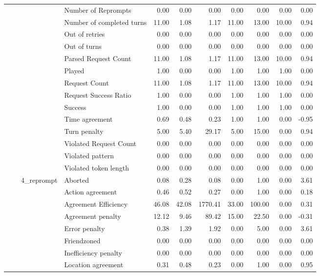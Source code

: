 \begin{tabular}{llllrrrrrrr}
 &  &  & Number of Reprompts & 0.00 & 0.00 & 0.00 & 0.00 & 0.00 & 0.00 & 0.00 \\
 &  &  & Number of completed turns & 11.00 & 1.08 & 1.17 & 11.00 & 13.00 & 10.00 & 0.94 \\
 &  &  & Out of retries & 0.00 & 0.00 & 0.00 & 0.00 & 0.00 & 0.00 & 0.00 \\
 &  &  & Out of turns & 0.00 & 0.00 & 0.00 & 0.00 & 0.00 & 0.00 & 0.00 \\
 &  &  & Parsed Request Count & 11.00 & 1.08 & 1.17 & 11.00 & 13.00 & 10.00 & 0.94 \\
 &  &  & Played & 1.00 & 0.00 & 0.00 & 1.00 & 1.00 & 1.00 & 0.00 \\
 &  &  & Request Count & 11.00 & 1.08 & 1.17 & 11.00 & 13.00 & 10.00 & 0.94 \\
 &  &  & Request Success Ratio & 1.00 & 0.00 & 0.00 & 1.00 & 1.00 & 1.00 & 0.00 \\
 &  &  & Success & 1.00 & 0.00 & 0.00 & 1.00 & 1.00 & 1.00 & 0.00 \\
 &  &  & Time agreement & 0.69 & 0.48 & 0.23 & 1.00 & 1.00 & 0.00 & -0.95 \\
 &  &  & Turn penalty & 5.00 & 5.40 & 29.17 & 5.00 & 15.00 & 0.00 & 0.94 \\
 &  &  & Violated Request Count & 0.00 & 0.00 & 0.00 & 0.00 & 0.00 & 0.00 & 0.00 \\
 &  &  & Violated pattern & 0.00 & 0.00 & 0.00 & 0.00 & 0.00 & 0.00 & 0.00 \\
 &  &  & Violated token length & 0.00 & 0.00 & 0.00 & 0.00 & 0.00 & 0.00 & 0.00 \\
\cline{3-11}
 &  & \multirow[t]{27}{*}{4_reprompt} & Aborted & 0.08 & 0.28 & 0.08 & 0.00 & 1.00 & 0.00 & 3.61 \\
 &  &  & Action agreement & 0.46 & 0.52 & 0.27 & 0.00 & 1.00 & 0.00 & 0.18 \\
 &  &  & Agreement Efficiency & 46.08 & 42.08 & 1770.41 & 33.00 & 100.00 & 0.00 & 0.31 \\
 &  &  & Agreement penalty & 12.12 & 9.46 & 89.42 & 15.00 & 22.50 & 0.00 & -0.31 \\
 &  &  & Error penalty & 0.38 & 1.39 & 1.92 & 0.00 & 5.00 & 0.00 & 3.61 \\
 &  &  & Friendzoned & 0.00 & 0.00 & 0.00 & 0.00 & 0.00 & 0.00 & 0.00 \\
 &  &  & Inefficiency penalty & 0.00 & 0.00 & 0.00 & 0.00 & 0.00 & 0.00 & 0.00 \\
 &  &  & Location agreement & 0.31 & 0.48 & 0.23 & 0.00 & 1.00 & 0.00 & 0.95 \\

\end{tabular}
